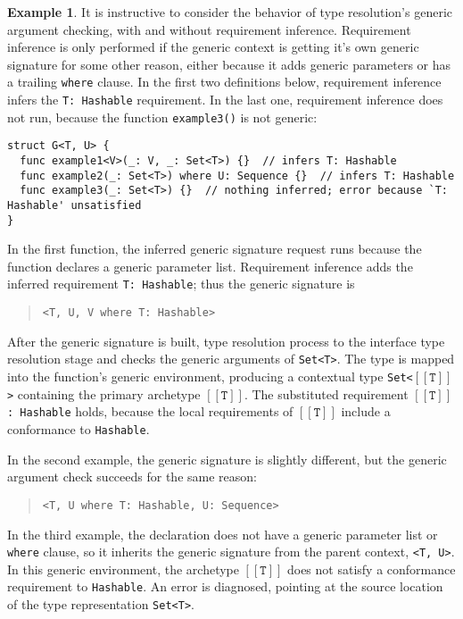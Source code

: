 \documentclass[a4paper,headsepline,bibliography=totoc,toc=flat,fleqn,twoside=semi]{scrbook}
\theoremstyle{definition}
\theoremstyle{definition}
\newtheorem{example}{Example}[chapter]
\theoremstyle{definition}
\newcommand{\archetype}[1]{$[\![\texttt{#1}]\!]$}
\begin{document}
\begin{example}
It is instructive to consider the behavior of type resolution's generic argument checking, with and without requirement inference. Requirement inference is only performed if the generic context is getting it's own generic signature for some other reason, either because it adds generic parameters or has a trailing \texttt{where} clause. In the first two definitions below, requirement inference infers the \texttt{T:\ Hashable} requirement. In the last one, requirement inference does not run, because the function \texttt{example3()} is not generic:
\begin{Verbatim}
struct G<T, U> {
  func example1<V>(_: V, _: Set<T>) {}  // infers T: Hashable
  func example2(_: Set<T>) where U: Sequence {}  // infers T: Hashable
  func example3(_: Set<T>) {}  // nothing inferred; error because `T: Hashable' unsatisfied
}
\end{Verbatim}
In the first function, the inferred generic signature request runs because the function declares a generic parameter list. Requirement inference adds the inferred requirement \texttt{T:\ Hashable}; thus the generic signature is
\begin{quote}
\begin{verbatim}
<T, U, V where T: Hashable>
\end{verbatim}
\end{quote}
After the generic signature is built, type resolution process to the interface type resolution stage and checks the generic arguments of \texttt{Set<T>}. The type is mapped into the function's generic environment, producing a contextual type \texttt{Set<\archetype{T}>} containing the primary archetype \archetype{T}. The substituted requirement \texttt{\archetype{T}:\ Hashable} holds, because the local requirements of \archetype{T} include a conformance to \texttt{Hashable}.

In the second example, the generic signature is slightly different, but the generic argument check succeeds for the same reason:
\begin{quote}
\begin{verbatim}
<T, U where T: Hashable, U: Sequence>
\end{verbatim}
\end{quote}

In the third example, the declaration does not have a generic parameter list or \texttt{where} clause, so it inherits the generic signature from the parent context, \texttt{<T, U>}. In this generic environment, the archetype \archetype{T} does not satisfy a conformance requirement to \texttt{Hashable}. An error is diagnosed, pointing at the source location of the type representation \texttt{Set<T>}.
\end{example}
\end{document}
